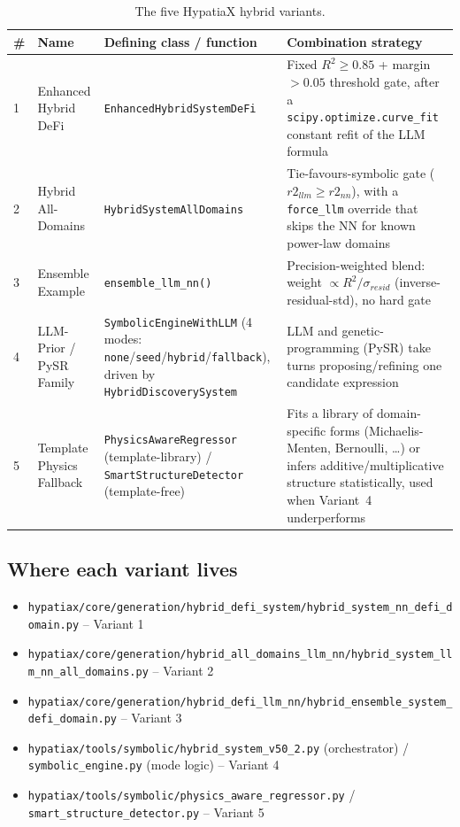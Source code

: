 \documentclass[11pt,a4paper]{article}
\newcommand{\code}[1]{\texttt{\small #1}}
\begin{document}
\begin{table}[h!]
\centering
\renewcommand{\arraystretch}{1.3}
\begin{tabular}{@{}p{0.6cm}p{4.0cm}p{4.6cm}p{4.6cm}@{}}
\toprule
\textbf{\#} & \textbf{Name} & \textbf{Defining class / function} & \textbf{Combination strategy} \\
\midrule
1 & Enhanced Hybrid DeFi & \code{EnhancedHybridSystemDeFi} & Fixed $R^2\!\geq\!0.85$ + margin$>0.05$ threshold gate, after a \code{scipy.optimize.curve\_fit} constant refit of the LLM formula \\
2 & Hybrid All-Domains & \code{HybridSystemAllDomains} & Tie-favours-symbolic gate ($r2_{llm}\!\geq\!r2_{nn}$), with a \code{force\_llm} override that skips the NN for known power-law domains \\
3 & Ensemble Example & \code{ensemble\_llm\_nn()} & Precision-weighted blend: weight $\propto R^2/\sigma_{resid}$ (inverse-residual-std), no hard gate \\
4 & LLM-Prior / PySR Family & \code{SymbolicEngineWithLLM} (4 modes: \code{none}/\code{seed}/\code{hybrid}/\code{fallback}), driven by \code{HybridDiscoverySystem} & LLM and genetic-programming (PySR) take turns proposing/refining one candidate expression \\
5 & Template Physics Fallback & \code{PhysicsAwareRegressor} (template-library) / \code{SmartStructureDetector} (template-free) & Fits a library of domain-specific forms (Michaelis-Menten, Bernoulli, \ldots) or infers additive/multiplicative structure statistically, used when Variant~4 underperforms \\
\bottomrule
\end{tabular}
\caption{The five HypatiaX hybrid variants.}
\end{table}

\subsection{Where each variant lives}
\begin{itemize}[leftmargin=1.3cm]
  \item[\code{[C1]}] \code{hypatiax/core/generation/hybrid\_defi\_system/hybrid\_system\_nn\_defi\_domain.py} -- Variant 1
  \item[\code{[C2]}] \code{hypatiax/core/generation/hybrid\_all\_domains\_llm\_nn/hybrid\_system\_llm\_nn\_all\_domains.py} -- Variant 2
  \item[\code{[C3]}] \code{hypatiax/core/generation/hybrid\_defi\_llm\_nn/hybrid\_ensemble\_system\_defi\_domain.py} -- Variant 3
  \item[\code{[T1]/[T2]}] \code{hypatiax/tools/symbolic/hybrid\_system\_v50\_2.py} (orchestrator) / \code{symbolic\_engine.py} (mode logic) -- Variant 4
  \item[\code{[T3]/[T4]}] \code{hypatiax/tools/symbolic/physics\_aware\_regressor.py} / \code{smart\_structure\_detector.py} -- Variant 5
\end{itemize}
\end{document}
